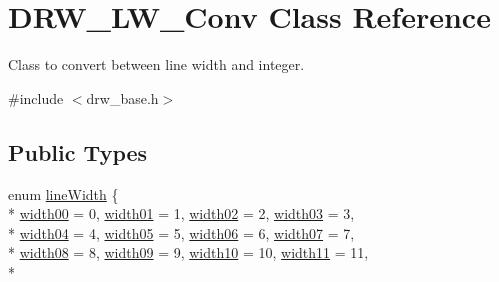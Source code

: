 \hypertarget{class_d_r_w___l_w___conv}{}\section{D\+R\+W\+\_\+\+L\+W\+\_\+\+Conv Class Reference}
\label{class_d_r_w___l_w___conv}


Class to convert between line width and integer.  




{\ttfamily \#include $<$drw\+\_\+base.\+h$>$}

\subsection*{Public Types}
\begin{DoxyCompactItemize}
\item 
enum \hyperlink{class_d_r_w___l_w___conv_aed68cbc3d8bdf7e20003dd2d970279b3}{line\+Width} \{ \\*
\hyperlink{class_d_r_w___l_w___conv_aed68cbc3d8bdf7e20003dd2d970279b3a3007c229abfe3c9f018b2a881384aa17}{width00} = 0, 
\hyperlink{class_d_r_w___l_w___conv_aed68cbc3d8bdf7e20003dd2d970279b3a27fc91eb33b8254bd0d0fbbb4b9430cc}{width01} = 1, 
\hyperlink{class_d_r_w___l_w___conv_aed68cbc3d8bdf7e20003dd2d970279b3aa85257cc5f5a011103273232c4f90822}{width02} = 2, 
\hyperlink{class_d_r_w___l_w___conv_aed68cbc3d8bdf7e20003dd2d970279b3ac0b97f9dfaf10daada26307bee172b82}{width03} = 3, 
\\*
\hyperlink{class_d_r_w___l_w___conv_aed68cbc3d8bdf7e20003dd2d970279b3a5f4b9dfe971a491e4250eb79e80cb603}{width04} = 4, 
\hyperlink{class_d_r_w___l_w___conv_aed68cbc3d8bdf7e20003dd2d970279b3acd3977a246f53b52046f215069e3a2bb}{width05} = 5, 
\hyperlink{class_d_r_w___l_w___conv_aed68cbc3d8bdf7e20003dd2d970279b3a770acce0ba10abcb50783062e464201d}{width06} = 6, 
\hyperlink{class_d_r_w___l_w___conv_aed68cbc3d8bdf7e20003dd2d970279b3a8c6d299834725dad1281e866f530dad2}{width07} = 7, 
\\*
\hyperlink{class_d_r_w___l_w___conv_aed68cbc3d8bdf7e20003dd2d970279b3a8b4ebbd7b5fa5f360907e53d4c3ef7a4}{width08} = 8, 
\hyperlink{class_d_r_w___l_w___conv_aed68cbc3d8bdf7e20003dd2d970279b3a9a8782efdcc8d0a6eb6400f05a9cb082}{width09} = 9, 
\hyperlink{class_d_r_w___l_w___conv_aed68cbc3d8bdf7e20003dd2d970279b3a90804835ca340953071b6aaf6fea9f9c}{width10} = 10, 
\hyperlink{class_d_r_w___l_w___conv_aed68cbc3d8bdf7e20003dd2d970279b3ad2ffa082a10ec1a0681f58db93ad4e92}{width11} = 11, 
\\*

\end{DoxyCompactItemize}
